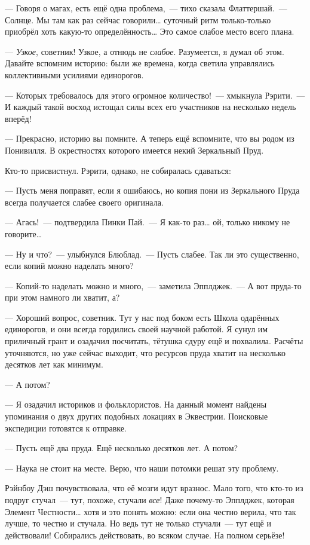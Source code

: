 \documentclass[twoside,a5paper,12pt]{extbook}
\begin{document}
— Говоря о магах, есть ещё одна проблема, — тихо сказала Флаттершай. — Солнце. Мы там как раз сейчас говорили… суточный ритм только-только приобрёл хоть какую-то определённость… Это самое слабое место всего плана.

— \textit{Узкое}, советник! Узкое, а отнюдь не \textit{слабое}. Разумеется, я думал об этом. Давайте вспомним историю: были же времена, когда светила управлялись коллективными усилиями единорогов.

— Которых требовалось для этого огромное количество! — хмыкнула Рэрити. — И каждый такой восход истощал силы всех его участников на несколько недель вперёд!

— Прекрасно, историю вы помните. А теперь ещё вспомните, что вы родом из Понивилля. В окрестностях которого имеется некий Зеркальный Пруд.

Кто-то присвистнул. Рэрити, однако, не собиралась сдаваться:

— Пусть меня поправят, если я ошибаюсь, но копия пони из Зеркального Пруда всегда получается слабее своего оригинала.

— Агась! — подтвердила Пинки Пай. — Я как-то раз… ой, только никому не говорите…

— Ну и что? — улыбнулся Блюблад. — Пусть слабее. Так ли это существенно, если копий можно наделать много?

— Копий-то наделать можно и много, — заметила Эпплджек. — А вот пруда-то при этом намного ли хватит, а?

— Хороший вопрос, советник. Тут у нас под боком есть Школа одарённых единорогов, и они всегда гордились своей научной работой. Я сунул им приличный грант и озадачил посчитать, тётушка сдуру ещё и похвалила. Расчёты уточняются, но уже сейчас выходит, что ресурсов пруда хватит на несколько десятков лет как минимум.

— А потом?

— Я озадачил историков и фольклористов. На данный момент найдены упоминания о двух других подобных локациях в Эквестрии. Поисковые экспедиции готовятся к отправке.

— Пусть ещё два пруда. Ещё несколько десятков лет. А потом?

— Наука не стоит на месте. Верю, что наши потомки решат эту проблему.

Рэйнбоу Дэш почувствовала, что её мозги идут вразнос. Мало того, что кто-то из подруг стучал — тут, похоже, стучали \textit{все}! Даже почему-то Эпплджек, которая Элемент Честности… хотя и это понять можно: если она честно верила, что так лучше, то честно и стучала. Но ведь тут не только стучали — тут ещё и действовали! Собирались действовать, во всяком случае. На полном серьёзе!
\end{document}
